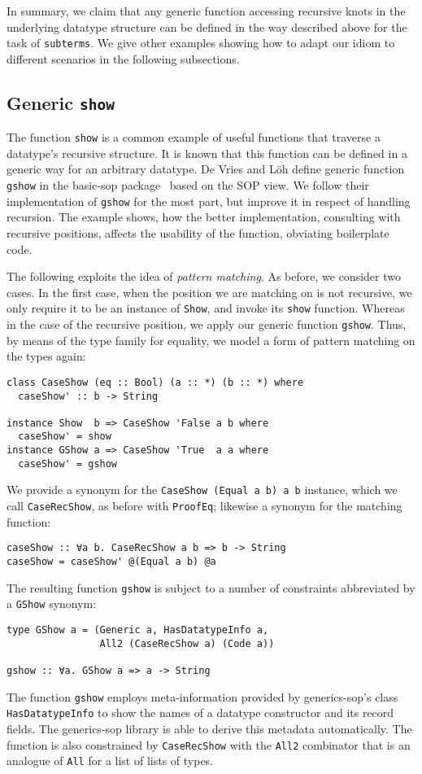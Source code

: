 \documentclass[runningheads]{llncs}
\newcommand{\K}[1]{\lstinline[style=fancy]{#1}}
\begin{document}
In summary, we claim that any generic function accessing recursive knots in the underlying datatype structure can be defined in the way described above for the task of \K{subterms}. We give other examples showing how to adapt our idiom to different scenarios in the following subsections.

\subsection{Generic \K{show}}
\label{subsec:gshow}

The function \K{show} is a common example of useful functions that traverse a datatype's recursive structure. It is known that this function can be defined in a generic way for an arbitrary datatype. De Vries and L\"{o}h define generic function \K{gshow} in the \textsf{basic-sop} package~\cite{basic-sop} based on the SOP view. We follow their implementation of \K{gshow} for the most part, but improve it in respect of handling recursion. The example shows, how the better implementation, consulting with recursive positions, affects the usability of the function, obviating boilerplate code.

The following exploits the idea of \emph{pattern matching}. As before, we consider two cases. In the first case, when the position we are matching on is not recursive, we only require it to be an  instance of \K{Show}, and invoke its \K{show} function. Whereas in the case of the recursive position, we apply our generic function \K{gshow}. Thus, by means of the type family for equality, we model a form of pattern matching on the types again:
\begin{lstlisting}[style=fancy]
class CaseShow (eq :: Bool) (a :: *) (b :: *) where
  caseShow' :: b -> String

instance Show  b => CaseShow 'False a b where
  caseShow' = show
instance GShow a => CaseShow 'True  a a where
  caseShow' = gshow
\end{lstlisting}
We provide a synonym for the \K{CaseShow (Equal a b) a b} instance, which we call \K{CaseRecShow}, as before with \K{ProofEq}; likewise a synonym for the matching function:
\begin{lstlisting}[style=fancy]
caseShow :: ∀a b. CaseRecShow a b => b -> String
caseShow = caseShow' @(Equal a b) @a
\end{lstlisting}

The resulting function \K{gshow} is subject to a number of constraints abbreviated by a \K{GShow} synonym:
\begin{lstlisting}[style=fancy]
type GShow a = (Generic a, HasDatatypeInfo a,
                All2 (CaseRecShow a) (Code a))

gshow :: ∀a. GShow a => a -> String
\end{lstlisting}
The function \K{gshow} employs meta-information provided by \textsf{generics-sop}'s class \K{HasDatatypeInfo} to show the names of a datatype constructor and its record fields. The \textsf{generics-sop} library is able to derive this metadata automatically.
The function is also constrained by \K{CaseRecShow} with the \K{All2} combinator that is an analogue of \K{All} for a list of lists of types. 
\end{document}
